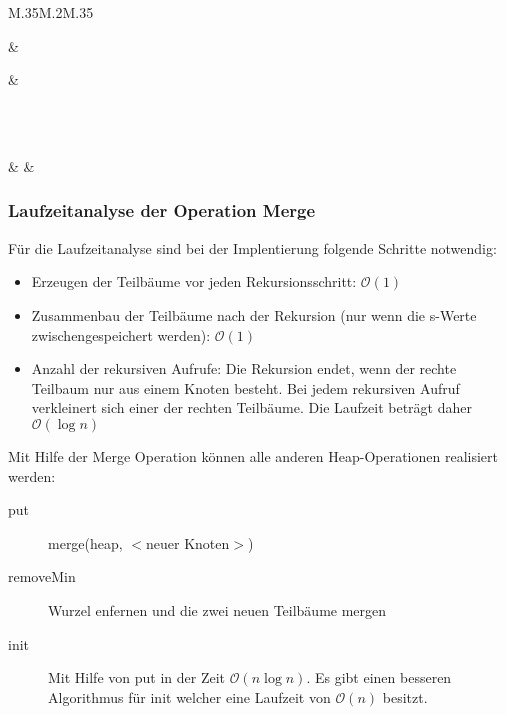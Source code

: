\begin{tabular}{M{.35\textwidth}M{.2\textwidth}M{.35\textwidth}}
\begin{tikzpicture}[sibling distance=5mm]
			]
			[.\node[state]{6};
				[.\node[state]{8}; ]
					\edge[none];[.{} ]
			]
		];
	\end{tikzpicture}
	&
	\begin{tikzpicture}[sibling distance=5mm]
		\Tree [.\node[state]{3};
			[.\node[state]{5};
				[.\node[state]{7}; ]
				\edge[none];[.{} ]
			]
			\edge[none];[.{} ]
		];
	\end{tikzpicture}
	&
	\begin{tikzpicture}[sibling distance=3mm]
		\Tree [.\node[state]{3};
			[.\node[state]{5};
				[.\node[state]{7}; ]
				\edge[none];[.{} ]
			]
			[.\node[state]{4};
				[.\node[state]{6};
					[.\node[state]{8}; ]
					[.\node[state]{6}; ]
				]
				[.\node[state]{6};
					[.\node[state]{8}; ]
						\edge[none];[.{} ]
				]
			]
		];
	\end{tikzpicture}	\\
	 \\
	\begin{tikzpicture}[sibling distance=3mm]
		\Tree [.\node[state]{3};
			[.\node[state]{4};
				[.\node[state]{6};
					[.\node[state]{8}; ]
					[.\node[state]{6}; ]
				]
				[.\node[state]{6};
					[.\node[state]{8}; ]
						\edge[none];[.{} ]
				]
			]
			[.\node[state]{5};
				[.\node[state]{7}; ]
				\edge[none];[.{} ]
			]
		];
	\end{tikzpicture}
	&
	&
\end{tabular}

\newpage
\subsubsection{Laufzeitanalyse der Operation Merge}
Für die Laufzeitanalyse sind bei der Implentierung folgende Schritte notwendig:
\begin{itemize}
	\item Erzeugen der Teilbäume vor jeden Rekursionsschritt: \(\mathcal{O}(1)\)
	\item Zusammenbau der Teilbäume nach der Rekursion (nur wenn die s-Werte zwischengespeichert werden): \(\mathcal{O}(1)\)
	\item Anzahl der rekursiven Aufrufe: Die Rekursion endet, wenn der rechte Teilbaum nur aus einem Knoten besteht.
		Bei jedem rekursiven Aufruf verkleinert sich einer der rechten Teilbäume.
		Die Laufzeit beträgt daher \(\mathcal{O}(\log n)\)
\end{itemize}
Mit Hilfe der Merge Operation können alle anderen Heap-Operationen realisiert werden:
\begin{description}
	\item[put] merge(heap, \(<\)neuer Knoten\(>\))
	\item[removeMin] Wurzel enfernen und die zwei neuen Teilbäume mergen
	\item[init] Mit Hilfe von put in der Zeit \(\mathcal{O}(n \log n)\). Es gibt einen besseren Algorithmus für init welcher eine Laufzeit von \(\mathcal{O}(n)\) besitzt.
\end{description}

